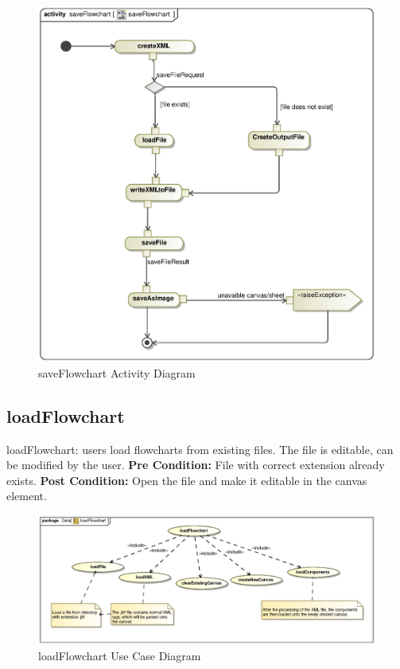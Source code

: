 \documentclass[12pt,a4paper,titlepage]{article}
\begin{document}
\begin{figure}[H]
  \centering
\includegraphics[width=500px]{saveFlowchart.eps}
\caption{saveFlowchart Activity Diagram}
\end{figure}

\newpage
\subsection{loadFlowchart}
loadFlowchart: users load flowcharts from existing files. The file is editable, can be modified by the user.\newline\newline
\textbf{Pre Condition:} File with correct extension already exists.\newline\newline
\textbf{Post Condition:} Open the file and make it editable in the canvas element.

\begin{figure}[H]
  \centering
\includegraphics[width=500px]{loadFlowchart.eps}
\caption{loadFlowchart Use Case Diagram}
\end{figure}
\end{document}
